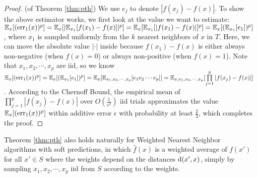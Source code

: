\begin{proof}(of Theorem \ref{thm:pth})
We use $e_j$ to denote $|f(x_j)-f(x)|$. To show the above estimator works, we first look at the value we want to estimate: $\mathbb E_{x}[({\mathrm{err}_1}(x))^p]=\mathbb E_{x}[|\mathbb E_{x_1}[f(x_1)-f(x)]|^p]=\mathbb E_{x}[\mathbb E_{x_1}[|f(x_1)-f(x)|]^p]=\mathbb E_{x}[(\mathbb E_{x_1}[e_1])^p]$, where $x_1$ is sampled uniformly from the $k$ nearest neighbors of $x$ in $T$. Here, we can move the absolute value $|\cdot|$ inside because $f(x_1)-f(x)$ is either always non-negative (when $f(x)=0$) or always non-positive (when $f(x)=1$). Note that $x_1,x_2,\cdots,x_p$ are iid, so we know $\mathbb E_{x}[({\mathrm{err}_1}(x))^p]=\mathbb E_{x}[ (\mathbb E_{x_1}[e_1])^p]=\mathbb E_{x}[\mathbb E_{x_1,x_2,\cdots,x_p}[e_1e_2\cdots e_p]]=\mathbb E_{x,x_1,x_2,\cdots,x_p}[\prod\limits_{j=1}^p|f(x_j)-f(x)|]$. According to the Chernoff Bound, the empirical mean of $\prod\limits_{j=1}^p|f(x_j)-f(x)|$ over $O(\frac 1{\epsilon^2})$ iid trials approximates the value $\mathbb E_{x}[({\mathrm{err}_1}(x))^p]$ within additive error $\epsilon$ with probability at least $\frac 23$, which completes the proof.
\end{proof}

Theorem \ref{thm:pth} also holds naturally for Weighted Nearest Neighbor algorithms \citep{R66} with soft predictions, in which $\hat f(x)$ is a weighted average of $f(x')$ for all $x'\in S$ where the weights depend on the distances ${\mathrm{d}}(x',x)$, simply by sampling $x_1,x_2,\cdots,x_p$ iid from $S$ according to the weights. 

